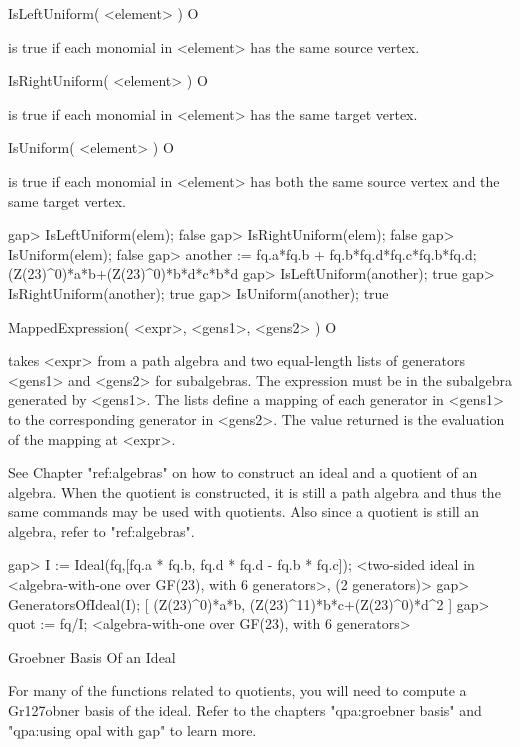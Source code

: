 \>IsLeftUniform( <element> ) O

is true if each monomial in <element>
has the same source vertex.

\>IsRightUniform( <element> ) O

is true if each monomial in <element>
has the same target vertex.

\>IsUniform( <element> ) O

is true if each monomial in <element>
has both the same source vertex and the same target vertex.

\beginexample
gap> IsLeftUniform(elem);
false
gap> IsRightUniform(elem);
false
gap> IsUniform(elem);
false
gap> another := fq.a*fq.b + fq.b*fq.d*fq.c*fq.b*fq.d;
(Z(23)^0)*a*b+(Z(23)^0)*b*d*c*b*d
gap> IsLeftUniform(another);
true
gap> IsRightUniform(another);
true
gap> IsUniform(another);
true
\endexample

\>MappedExpression( <expr>, <gens1>, <gens2> ) O

takes <expr> from a path algebra
and two equal-length lists of generators <gens1> and <gens2>
for subalgebras.
The expression must be in the subalgebra generated
by <gens1>.
The lists define a mapping of each generator in <gens1>
to the corresponding generator in <gens2>.
The value returned is the evaluation of the mapping at <expr>.


See Chapter "ref:algebras" on how to construct an ideal and a quotient of
an algebra.  When the quotient is constructed, it is still a path algebra and
thus the same commands may be used with quotients.  Also since a quotient is 
still an algebra, refer to "ref:algebras".

\beginexample
gap> I := Ideal(fq,[fq.a * fq.b, fq.d * fq.d - fq.b * fq.c]);
<two-sided ideal in <algebra-with-one over GF(23), with 6 generators>,
  (2 generators)>
gap> GeneratorsOfIdeal(I);
[ (Z(23)^0)*a*b, (Z(23)^11)*b*c+(Z(23)^0)*d^2 ]
gap> quot := fq/I;
<algebra-with-one over GF(23), with 6 generators>
\endexample



\>Groebner Basis Of an Ideal

For many of the functions related to quotients, you will need to compute a 
Gr\accent127obner basis of the ideal.  Refer to the chapters "qpa:groebner basis" and 
"qpa:using opal with gap" to learn more.

